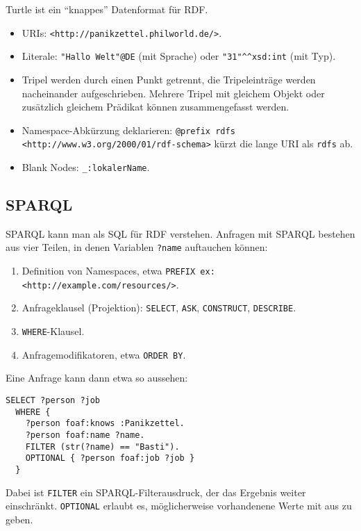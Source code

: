 \documentclass[a4paper,parskip=half*,DIV=15,fontsize=11pt]{scrartcl}
\begin{document}
Turtle ist ein ``knappes'' Datenformat für RDF.

\begin{itemize}
  \item URIs: \lstinline{<http://panikzettel.philworld.de/>}.
  \item Literale: \lstinline{"Hallo Welt"@DE} (mit Sprache) oder \lstinline{"31"^^xsd:int} (mit Typ).
  \item Tripel werden durch einen Punkt getrennt, die Tripeleinträge werden nacheinander aufgeschrieben. Mehrere Tripel mit gleichem Objekt oder zusätzlich gleichem Prädikat können zusammengefasst werden.
  \item Namespace-Abkürzung deklarieren: \lstinline{@prefix rdfs <http://www.w3.org/2000/01/rdf-schema>} kürzt die lange URI als \lstinline{rdfs} ab.
  \item Blank Nodes: \lstinline{_:lokalerName}.
\end{itemize}

\subsection{SPARQL}

SPARQL kann man als SQL für RDF verstehen. Anfragen mit SPARQL bestehen aus vier Teilen, in denen Variablen \lstinline{?name} auftauchen können:

\begin{enumerate}
  \item Definition von Namespaces, etwa \lstinline{PREFIX ex: <http://example.com/resources/>}.
  \item Anfrageklausel (Projektion): \lstinline{SELECT}, \lstinline{ASK}, \lstinline{CONSTRUCT}, \lstinline{DESCRIBE}.
  \item \lstinline{WHERE}-Klausel.
  \item Anfragemodifikatoren, etwa \lstinline{ORDER BY}.
\end{enumerate}

Eine Anfrage kann dann etwa so aussehen:

\begin{lstlisting}
SELECT ?person ?job
  WHERE {
    ?person foaf:knows :Panikzettel.
    ?person foaf:name ?name.
    FILTER (str(?name) == "Basti").
    OPTIONAL { ?person foaf:job ?job }
  }
\end{lstlisting}

Dabei ist \lstinline{FILTER} ein SPARQL-Filterausdruck, der das Ergebnis weiter einschränkt. \lstinline{OPTIONAL} erlaubt es, möglicherweise vorhandenene Werte mit aus zu geben.
\end{document}
